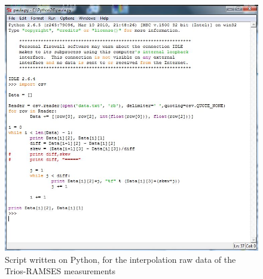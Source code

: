 \documentclass[10pt, a4paper]{article}
\begin{document}
\begin{figure}[H]
	\centering
	\includegraphics[scale=0.30]{Fig-24.jpg}
	\caption{Script written on Python, for the interpolation raw data of the Trios-RAMSES measurements}
	\label{fig:24}
\end{figure}
\end{document}
